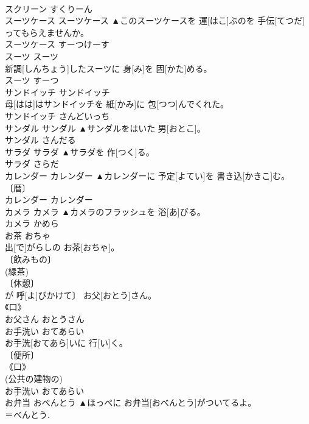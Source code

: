 \documentclass[8pt]{extreport}
\begin{document}
\begin{CJK}{UTF8}{min}
\\	スクリーン	すくりーん	
\\	スーツケース	スーツケース	▲このスーツケースを 運[はこ]ぶのを 手伝[てつだ]ってもらえませんか。	
\\	スーツケース	すーつけーす	
\\	スーツ	スーツ	
\\	新調[しんちょう]したスーツに 身[み]を 固[かた]める。	
\\	スーツ	すーつ	
\\	サンドイッチ	サンドイッチ	
\\	母[はは]はサンドイッチを 紙[かみ]に 包[つつ]んでくれた。	
\\	サンドイッチ	さんどいっち	
\\	サンダル	サンダル	▲サンダルをはいた 男[おとこ]。	
\\	サンダル	さんだる	
\\	サラダ	サラダ	▲サラダを 作[つく]る。	
\\	サラダ	さらだ	
\\	カレンダー	カレンダー	▲カレンダーに 予定[よてい]を 書き込[かきこ]む。	
\\	〔暦〕 
\\	カレンダー	カレンダー	
\\	カメラ	カメラ	▲カメラのフラッシュを 浴[あ]びる。	
\\	カメラ	かめら	
\\	お茶	おちゃ	
\\	出[で]がらしの お茶[おちゃ]。	
\\	〔飲みもの〕 
\\	(緑茶) 
\\	〔休憩〕 
\\	[⇒ちゃ 
\\	〔茶の湯〕 
\\	お茶	おちゃ	
\\	お父さん	おとうさん	
\\	子[こ]が 呼[よ]びかけて〕 お父[おとう]さん。	
\\	《口》 
\\	お父さん	おとうさん	
\\	お手洗い	おてあらい	
\\	お手洗[おてあら]いに 行[い]く。	
\\	〔便所〕 
\\	《口》 
\\	(公共の建物の) 
\\	お手洗い	おてあらい	
\\	お弁当	おべんとう	▲ほっぺに お弁当[おべんとう]がついてるよ。	
\\	＝べんとう. 

\end{CJK}
\end{document}
